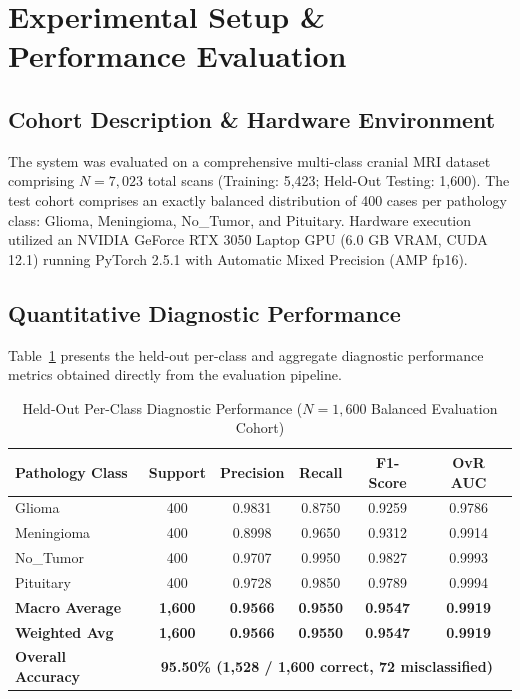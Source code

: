 \documentclass[journal,twocolumn,10pt]{IEEEtran}
\begin{document}
\section{Experimental Setup \& Performance Evaluation}

\subsection{Cohort Description \& Hardware Environment}
The system was evaluated on a comprehensive multi-class cranial MRI dataset comprising $N = 7,023$ total scans (Training: 5,423; Held-Out Testing: 1,600). The test cohort comprises an exactly balanced distribution of 400 cases per pathology class: Glioma, Meningioma, No\_Tumor, and Pituitary. Hardware execution utilized an NVIDIA GeForce RTX 3050 Laptop GPU (6.0 GB VRAM, CUDA 12.1) running PyTorch 2.5.1 with Automatic Mixed Precision (AMP fp16).

\subsection{Quantitative Diagnostic Performance}
Table~\ref{tab:metrics} presents the held-out per-class and aggregate diagnostic performance metrics obtained directly from the evaluation pipeline.

\begin{table}[htbp]
\caption{Held-Out Per-Class Diagnostic Performance ($N = 1,600$ Balanced Evaluation Cohort)}
\label{tab:metrics}
\centering
\begin{tabular}{lccccc}
\toprule
\textbf{Pathology Class} & \textbf{Support} & \textbf{Precision} & \textbf{Recall} & \textbf{F1-Score} & \textbf{OvR AUC} \\
\midrule
Glioma & 400 & 0.9831 & 0.8750 & 0.9259 & 0.9786 \\
Meningioma & 400 & 0.8998 & 0.9650 & 0.9312 & 0.9914 \\
No\_Tumor & 400 & 0.9707 & 0.9950 & 0.9827 & 0.9993 \\
Pituitary & 400 & 0.9728 & 0.9850 & 0.9789 & 0.9994 \\
\midrule
\textbf{Macro Average} & \textbf{1,600} & \textbf{0.9566} & \textbf{0.9550} & \textbf{0.9547} & \textbf{0.9919} \\
\textbf{Weighted Avg} & \textbf{1,600} & \textbf{0.9566} & \textbf{0.9550} & \textbf{0.9547} & \textbf{0.9919} \\
\textbf{Overall Accuracy} & \multicolumn{5}{c}{\textbf{95.50\% (1,528 / 1,600 correct, 72 misclassified)}} \\
\bottomrule
\end{tabular}
\end{table}
\end{document}
